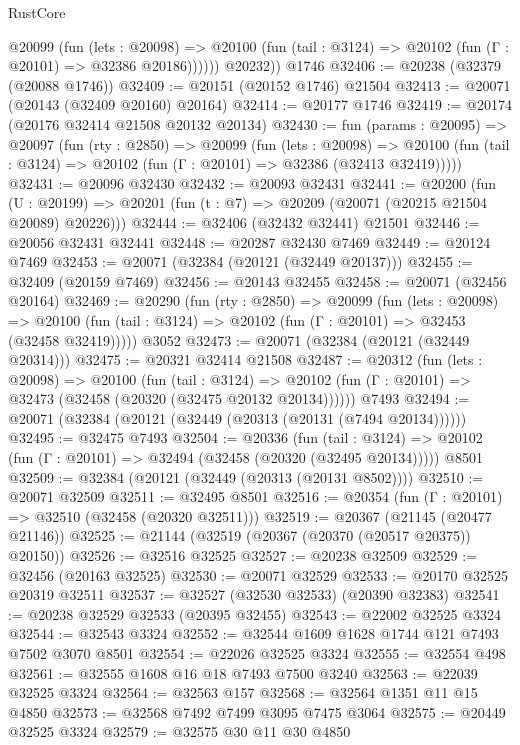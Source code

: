 \begin{lexlean}{RustCore}
\begin{coremodule}
            @20099
              (fun (lets : @20098) =>
              @20100 (fun (tail : @3124) => @20102 (fun (Γ : @20101) => @32386 @20186))))))
        @20232))
    @1746
@32406 := @20238 (@32379 (@20088 @1746))
@32409 := @20151 (@20152 @1746) @21504
@32413 := @20071 (@20143 (@32409 @20160) @20164)
@32414 := @20177 @1746
@32419 := @20174 (@20176 @32414 @21508 @20132 @20134)
@32430 := fun (params : @20095) =>
  @20097
    (fun (rty : @2850) =>
    @20099
      (fun (lets : @20098) =>
      @20100 (fun (tail : @3124) => @20102 (fun (Γ : @20101) => @32386 (@32413 @32419)))))
@32431 := @20096 @32430
@32432 := @20093 @32431
@32441 := @20200
    (fun (U : @20199) => @20201 (fun (t : @7) => @20209 (@20071 (@20215 @21504 @20089) @20226)))
@32444 := @32406 (@32432 @32441) @21501
@32446 := @20056 @32431 @32441
@32448 := @20287 @32430 @7469
@32449 := @20124 @7469
@32453 := @20071 (@32384 (@20121 (@32449 @20137)))
@32455 := @32409 (@20159 @7469)
@32456 := @20143 @32455
@32458 := @20071 (@32456 @20164)
@32469 := @20290
    (fun (rty : @2850) =>
    @20099
      (fun (lets : @20098) =>
      @20100 (fun (tail : @3124) => @20102 (fun (Γ : @20101) => @32453 (@32458 @32419)))))
    @3052
@32473 := @20071 (@32384 (@20121 (@32449 @20314)))
@32475 := @20321 @32414 @21508
@32487 := @20312
    (fun (lets : @20098) =>
    @20100
      (fun (tail : @3124) =>
      @20102 (fun (Γ : @20101) => @32473 (@32458 (@20320 (@32475 @20132 @20134))))))
    @7493
@32494 := @20071 (@32384 (@20121 (@32449 (@20313 (@20131 (@7494 @20134))))))
@32495 := @32475 @7493
@32504 := @20336
    (fun (tail : @3124) => @20102 (fun (Γ : @20101) => @32494 (@32458 (@20320 (@32495 @20134)))))
    @8501
@32509 := @32384 (@20121 (@32449 (@20313 (@20131 @8502))))
@32510 := @20071 @32509
@32511 := @32495 @8501
@32516 := @20354 (fun (Γ : @20101) => @32510 (@32458 (@20320 @32511)))
@32519 := @20367 (@21145 (@20477 @21146))
@32525 := @21144 (@32519 (@20367 (@20370 (@20517 @20375)) @20150))
@32526 := @32516 @32525
@32527 := @20238 @32509
@32529 := @32456 (@20163 @32525)
@32530 := @20071 @32529
@32533 := @20170 @32525 @20319 @32511
@32537 := @32527 (@32530 @32533) (@20390 @32383)
@32541 := @20238 @32529 @32533 (@20395 @32455)
@32543 := @22002 @32525 @3324
@32544 := @32543 @3324
@32552 := @32544 @1609 @1628 @1744 @121 @7493 @7502 @3070 @8501
@32554 := @22026 @32525 @3324
@32555 := @32554 @498
@32561 := @32555 @1608 @16 @18 @7493 @7500 @3240
@32563 := @22039 @32525 @3324
@32564 := @32563 @157
@32568 := @32564 @1351 @11 @15 @4850
@32573 := @32568 @7492 @7499 @3095 @7475 @3064
@32575 := @20449 @32525 @3324
@32579 := @32575 @30 @11 @30 @4850

\end{coremodule}
\end{lexlean}

